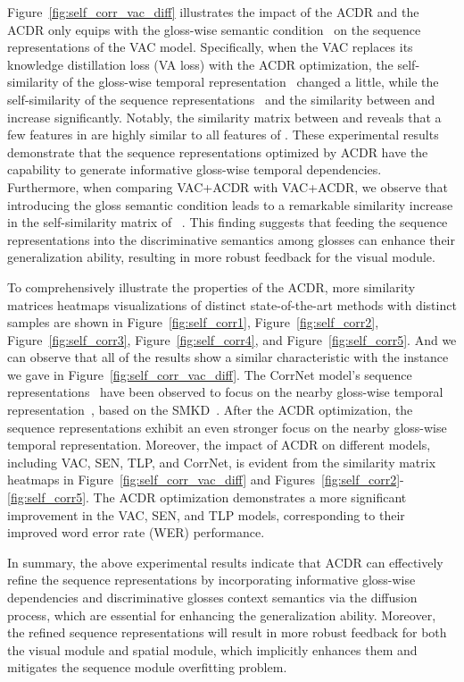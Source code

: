 \documentclass[sigconf]{acmart}
\begin{document}
Figure~\ref{fig:self_corr_vac_diff} illustrates the impact of the ACDR and the ACDR only equips with the gloss-wise semantic condition~ on the sequence representations of the VAC model. 
Specifically, when the VAC replaces its knowledge distillation loss (VA loss) with the ACDR optimization, the self-similarity of the gloss-wise temporal representation~ changed a little, while the self-similarity of the sequence representations~ and the similarity between  and  increase significantly. 
Notably, the similarity matrix between  and  reveals that a few features in  are highly similar to all features of .
These experimental results demonstrate that the sequence representations optimized by ACDR have the capability to generate informative gloss-wise temporal dependencies. 
Furthermore, when comparing VAC+ACDR with VAC+ACDR, we observe that introducing the gloss semantic condition leads to a remarkable similarity increase in the self-similarity matrix of ~. This finding suggests that feeding the sequence representations into the discriminative semantics among glosses can enhance their generalization ability, resulting in more robust feedback for the visual module.

To comprehensively illustrate the properties of the ACDR, more similarity matrices heatmaps visualizations of distinct state-of-the-art methods with distinct samples are shown in Figure~\ref{fig:self_corr1}, Figure~\ref{fig:self_corr2}, Figure~\ref{fig:self_corr3}, Figure~\ref{fig:self_corr4}, and Figure~\ref{fig:self_corr5}.
And we can observe that all of the results show a similar characteristic with the instance we gave in Figure~\ref{fig:self_corr_vac_diff}.
The CorrNet model's sequence representations~ have been observed to focus on the nearby gloss-wise temporal representation~, based on the SMKD~\cite{hao2021self}. After the ACDR optimization, the sequence representations exhibit an even stronger focus on the nearby gloss-wise temporal representation.
Moreover, the impact of ACDR on different models, including VAC, SEN, TLP, and CorrNet, is evident from the similarity matrix heatmaps in Figure~\ref{fig:self_corr_vac_diff} and Figures~\ref{fig:self_corr2}-\ref{fig:self_corr5}. The ACDR optimization demonstrates a more significant improvement in the VAC, SEN, and TLP models, corresponding to their improved word error rate (WER) performance.

In summary, the above experimental results indicate that ACDR can effectively refine the sequence representations by incorporating informative gloss-wise dependencies and discriminative glosses context semantics via the diffusion process, which are essential for enhancing the generalization ability. 
Moreover, the refined sequence representations will result in more robust feedback for both the visual module and spatial module, which implicitly enhances them and mitigates the sequence module overfitting problem.
\end{document}
